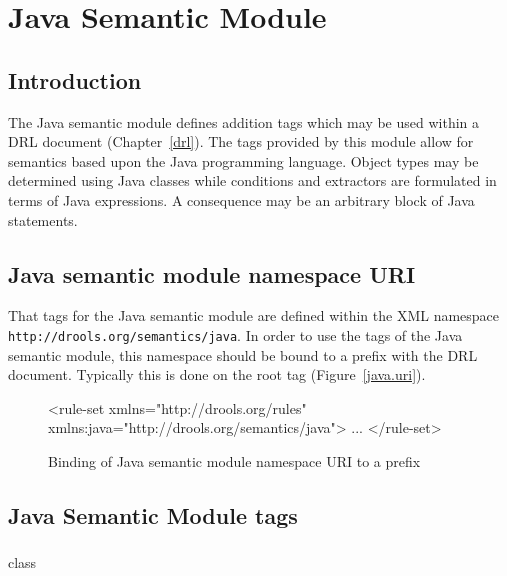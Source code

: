 \chapter{Java Semantic Module}

\section{Introduction}

The Java semantic module defines addition tags which may be used
within a DRL document (Chapter~\vref{drl}).  The tags provided by
this module allow for semantics based upon the Java programming
language.  Object types may be determined using Java classes while
conditions and extractors are formulated in terms of Java expressions.
A consequence may be an arbitrary block of Java statements.

\section{Java semantic module namespace URI}

That tags for the Java semantic module are defined within the
XML namespace \texttt{http://drools.org/semantics/java}.  In order
to use the tags of the Java semantic module, this namespace should
be bound to a prefix with the DRL document.  Typically this is done
on the root  tag (Figure~\vref{java.uri}).

\begin{figure}
\begin{tagExample}
<rule-set xmlns="http://drools.org/rules"
          {\color{black}xmlns:java="http://drools.org/semantics/java"}>
    ...
</rule-set>
\end{tagExample}
\caption{Binding of Java semantic module namespace URI to a prefix}
\label{java.uri}
\end{figure}

\section{Java Semantic Module tags}

\subsection{}
\label{java.class}

\begin{tagDesc}{class}
\noattrs
{}
\end{tagDesc}

